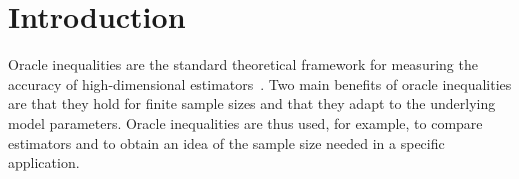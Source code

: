 \documentclass[bj]{imsart}
\newcommand{\norm}[1]{\ensuremath{\!|\!| #1 | \! |}}
\newcommand{\1}{{\rm 1}\mskip -4,5mu{\rm l} }
\begin{document}
\begin{frontmatter}
\begin{keyword}
\end{keyword}

\end{frontmatter}



\newcommand{\outcome}{\textcolor{black}{\ensuremath{Y}}}
\newcommand{\design}{\textcolor{black}{\ensuremath{X}}}
\newcommand{\noise}{\textcolor{black}{\ensuremath{\varepsilon}}}
\newcommand{\truth}{\textcolor{black}{\ensuremath{\beta^*}}}

\newcommand{\tuningparameter}{\ensuremath{\lambda}}
\newcommand{\estimator}{\ensuremath{\widehat \beta}}
\newcommand{\estimatort}{\ensuremath{\estimator^\tuningparameter}}
\newcommand{\tildeestimator}{\ensuremath{\tilde\beta^\tuningparameter}}
\newcommand{\estimatortprime}{\ensuremath{\estimator^{\tuningparameter'}}}


\newcommand{\linkfunction}{\ensuremath{g}}

\newcommand{\numbergroups}{\ensuremath{k}}

\newcommand{\normj}[1]{\textcolor{black}{\ensuremath{\norm{#1}_j}}}
\newcommand{\normjd}[1]{\textcolor{black}{\ensuremath{\norm{#1}_j^*}}}
\newcommand{\normjj}[1]{\textcolor{black}{\ensuremath{\norm{#1}_j^{j-1}}}}
\newcommand{\normjjj}[1]{\textcolor{black}{\ensuremath{\norm{#1}_j^j}}}

\newcommand{\groupset}{\ensuremath{A}}
\newcommand{\groupsets}{\ensuremath{A_1,\dots,A_\numbergroups}}
\newcommand{\groupsize}{\ensuremath{a}}
\newcommand{\groupsizes}{\ensuremath{a_1,\dots,a_\numbergroups}}
\newcommand{\fusedmatrix}{\ensuremath{M}}
\newcommand{\fusedmatrixj}{\ensuremath{M_j}}




\newcommand{\estimatororacle}{\overline \beta}

\newcommand{\projectionmatrix}{P}
\newcommand{\projectionmatrixj}{\textcolor{black}{P_j}}
\newcommand{\projectionmatrixs}{\ensuremath{\textcolor{black}{P_1,\dots,P_\numbergroups}}}
\section{Introduction} Oracle inequalities are the standard theoretical framework for measuring the accuracy of high-dimensional estimators~\cite{Buhlmann11}. Two main benefits of oracle inequalities are that they hold for finite sample sizes and that they adapt to the underlying model parameters. Oracle inequalities are thus used, for example, to compare estimators and to obtain an idea of the sample size needed in a specific application.
\end{document}
